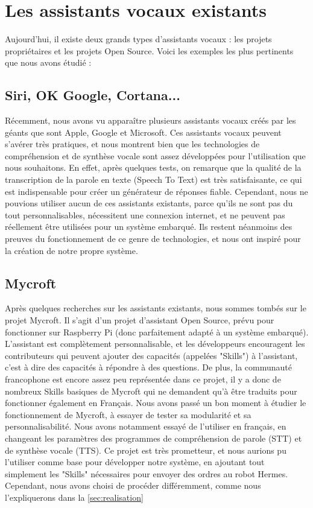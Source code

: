 \documentclass[a4paper,10pt]{report}
\begin{document}
    \section{Les assistants vocaux existants}
    {Aujourd'hui, il existe deux grands types d'assistants vocaux : les projets propriétaires et les projets Open Source. Voici les exemples les plus pertinents que nous avons étudié :}
      \subsection{Siri, OK Google, Cortana...}
      {Récemment, nous avons vu apparaître plusieurs assistants vocaux créés par les géants que sont Apple, Google et Microsoft. Ces assistants vocaux peuvent s'avérer très pratiques, et nous montrent bien que les technologies de compréhension et de synthèse vocale sont assez développées pour l'utilisation que nous souhaitons. En effet, après quelques tests, on remarque que la qualité de la transcription de la parole en texte (Speech To Text) est très satisfaisante, ce qui est indispensable pour créer un générateur de réponses fiable.}
      {Cependant, nous ne pouvions utiliser aucun de ces assistants existants, parce qu'ils ne sont pas du tout personnalisables, nécessitent une connexion internet, et ne peuvent pas réellement être utilisées pour un système embarqué. Ils restent néanmoins des preuves du fonctionnement de ce genre de technologies, et nous ont inspiré pour la création de notre propre système.}

      \subsection{Mycroft}
      {Après quelques recherches sur les assistants existants, nous sommes tombés sur le projet Mycroft. Il s'agit d'un projet d'assistant Open Source, prévu pour fonctionner sur Raspberry Pi (donc parfaitement adapté à un système embarqué). L'assistant est complètement personnalisable, et les développeurs encouragent les contributeurs qui peuvent ajouter des capacités (appelées "Skills") à l'assistant, c'est à dire des capacités à répondre à des questions. De plus, la communauté francophone est encore assez peu représentée dans ce projet, il y a donc de nombreux Skills basiques de Mycroft qui ne demandent qu'à être traduits pour fonctionner également en Français.}
      {Nous avons passé un bon moment à étudier le fonctionnement de Mycroft, à essayer de tester sa modularité et sa personnalisabilité. Nous avons notamment essayé de l'utiliser en français, en changeant les paramètres des programmes de compréhension de parole (STT) et de synthèse vocale (TTS).}
      {Ce projet est très prometteur, et nous aurions pu l'utiliser comme base pour développer notre système, en ajoutant tout simplement les "Skills" nécessaires pour envoyer des ordres au robot Hermes. Cependant, nous avons choisi de procéder différemment, comme nous l'expliquerons dans la \autoref{sec:realisation}}
\end{document}
